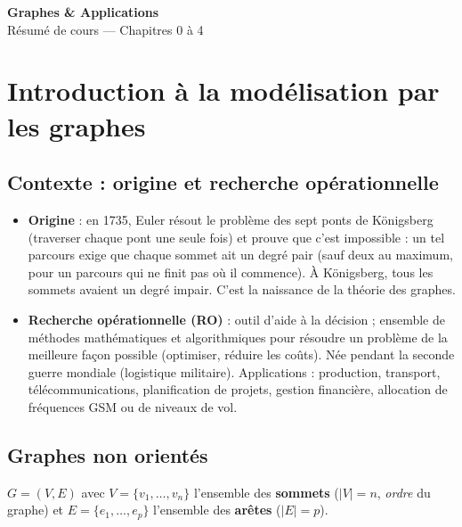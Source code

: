 \documentclass[11pt,a4paper]{article}
\begin{document}
\begin{center}
{\LARGE\bfseries Graphes \& Applications}\\[6pt]
{\large Résumé de cours --- Chapitres 0 à 4}
\end{center}
\vspace{2pt}
\tableofcontents
\vspace{4pt}

\section{Introduction à la modélisation par les graphes}

\subsection{Contexte : origine et recherche opérationnelle}
\begin{itemize}[nosep]
\item \textbf{Origine} : en 1735, Euler résout le problème des sept ponts de Königsberg (traverser chaque pont une seule fois) et prouve que c'est impossible : un tel parcours exige que chaque sommet ait un degré pair (sauf deux au maximum, pour un parcours qui ne finit pas où il commence). À Königsberg, tous les sommets avaient un degré impair. C'est la naissance de la théorie des graphes.
\item \textbf{Recherche opérationnelle (RO)} : outil d'aide à la décision ; ensemble de méthodes mathématiques et algorithmiques pour résoudre un problème de la meilleure façon possible (optimiser, réduire les coûts). Née pendant la seconde guerre mondiale (logistique militaire). Applications : production, transport, télécommunications, planification de projets, gestion financière, allocation de fréquences GSM ou de niveaux de vol.
\end{itemize}

\subsection{Graphes non orientés}
\begin{definition}
$G=(V,E)$ avec $V=\{v_1,\dots,v_n\}$ l'ensemble des \textbf{sommets} ($|V|=n$, \emph{ordre} du graphe) et $E=\{e_1,\dots,e_p\}$ l'ensemble des \textbf{arêtes} ($|E|=p$).
\end{definition}
\end{document}
